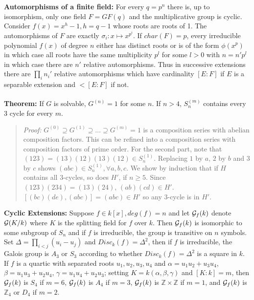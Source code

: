 \\
\\
{\bf Automorphisms of a finite field:}
For every $q=p^n$ there is, up to isomorphism, only one field $F=GF(q)$ and the
multiplicative group is cyclic. Consider $f(x)= x^h-1, h=q-1$ whose roots are
roots of 1.  The automorphisms of $F$ are exactly $\sigma_i : x \mapsto x^{p^i}$.
If $char(F)=p$, every irreducible polynomial $f(x)$ of degree $n$
either has distinct roots or is of
the form $\phi(x^p)$ in which case all roots have the same multiplicity $p^l$ for
some $l>0$ with $n=n' p^l$ in which case there are $n'$ relative automorphisms.  Thus
in successive extensions there are $\prod_i n_i'$ relative automorphisms which have
cardinality
$[E:F]$ if $E$ is a separable extension and $<[E:F]$ if not.
\\
\\
{\bf Theorem:}
If $G$ is solvable, $G^{(n)}=1$ for some $n$.  If $n>4$, $S_{n}^{(m)}$
contains every 3 cycle for every $m$.
\begin{quote}
\emph{Proof:} $G^{(0)} \supseteq G^{(1)} \supseteq \ldots \supseteq G^{(m)} = 1$ is
a composition series with abelian composition factors.  This can be refined into a
composition series with composition factors of prime order.  For the second part,
note that $(123) = (13)(12)(13)(12) \in S_{n}^{(1)}$.  Replacing $1$ by $a$,
$2$ by $b$ and $3$ by $c$ shows $(abc) \in S_{n}^{(1)}, \forall a, b, c$.
We show by induction that if $H$ contains all $3$-cycles, so does $H'$, if $n \ge 5$.
Since $(123)(234) = (13)(24)$, $(ab)(cd) \in H'$. $[(bc)(de),(abc)] =(abc) \in H'$ so
any $3$-cycle is in $H'$.
\end{quote}
{\bf Cyclic Extensions:}
Suppose $f \in k[x], deg(f)=n$ and let
${\cal G}_f(k)$ denote 
${\cal G}(K/k)$ where $K$ is the splitting field for $f$ over $k$. Then
${\cal G}_f(k)$ is isomorphic to some subgroup of $S_n$ and if $f$ is irreducible,
the group is transitive on $n$ symbols.  Set $\Delta= \prod_{i<j} (u_i-u_j)$ and
$Disc_k(f)= \Delta^2$, then if $f$ is irreducible, the Galois group is
$A_3$ or $S_3$ according to whether 
$Disc_k(f)= \Delta^2$ is a square in $k$.  If $f$ is a quartic with separated roots
$u_1, u_2, u_3, u_4$ and
$\alpha= u_1 u_2 + u_3 u_4$,
$\beta= u_1 u_3 + u_2 u_4$,
$\gamma= u_1 u_4 + u_2 u_3$; setting $K=k(\alpha, \beta, \gamma)$ and
$[K:k]=m$, then
${\cal G}_f(k)$ is $S_4$ if $m=6$,
${\cal G}_f(k)$ is $A_4$ if $m=3$,
${\cal G}_f(k)$ is ${\mathbb Z} \times {\mathbb Z}$ if $m=1$, and
${\cal G}_f(k)$ is ${\mathbb Z}_4$ 
or $D_4$ if $m=2$.
\\
